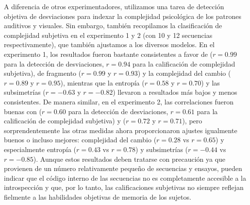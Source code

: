 
A diferencia de otros experimentadores, utilizamos una tarea de detección objetiva de desviaciones para indexar la complejidad psicológica de los patrones auditivos y visuales. Sin embargo, también recopilamos la clasificación de complejidad subjetiva en el experimento 1 y 2 (con 10 y 12 secuencias respectivamente), que también ajustamos a los diversos modelos. En el experimento 1, los resultados fueron bastante consistentes a favor de \mdlbin ($r = 0.99$ para la detección de desviaciones, $r = 0.94$ para la calificación de complejidad subjetiva), \mdlbin de fragmento ($r = 0.99$ y $r = 0.93$) y la complejidad del cambio ($r = 0.89$ y $r = 0.95$), mientras que la entropía ($r = 0.58$ y $r = 0.70$) y las subsimetrías ($r = -0.63$ y $r = -0.82$) llevaron a resultados más bajos y menos consistentes. De manera similar, en el experimento 2, las correlaciones fueron buenas con \mdlbin ($r = 0.60$ para la detección de desviaciones, $r = 0.61$ para la calificación de complejidad subjetiva) y \mdlbinfrag ($r = 0.72$ y $r = 0.71$), pero sorprendentemente las otras medidas ahora proporcionaron ajustes igualmente buenos o incluso mejores: complejidad del cambio ($r = 0.28$ vs $r = 0.65$) y especialmente entropía ($r = 0.43$ vs $r = 0.78$) y subsimetrías ($r = -0.44$ vs $r = -0.85$). Aunque estos resultados deben tratarse con precaución ya que provienen de un número relativamente pequeño de secuencias y ensayos, pueden indicar que el código interno de las secuencias no es completamente accesible a la introspección y que, por lo tanto, las calificaciones subjetivas no siempre reflejan fielmente a las habilidades objetivas de memoria de los sujetos.


